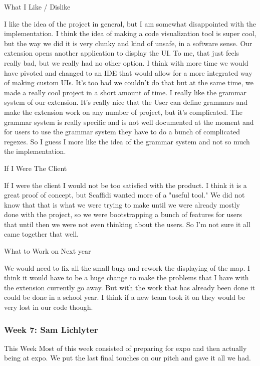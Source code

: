 What I Like / Dislike

I like the idea of the project in general, but I am somewhat disappointed with the implementation. I think the idea of making a code visualization tool is super cool, but the way we did it is very clunky and kind of unsafe, in a software sense. Our extension opens another application to display the UI. To me, that just feels really bad, but we really had no other option. I think with more time we would have pivoted and changed to an IDE that would allow for a more integrated way of making custom UIs. It's too bad we couldn't do that but at the same time, we made a really cool project in a short amount of time. I really like the grammar system of our extension. It's really nice that the User can define grammars and make the extension work on any number of project, but it's complicated. The grammar system is really specific and is not well documented at the moment and for users to use the grammar system they have to do a bunch of complicated regexes. So I guess I more like the idea of the grammar system and not so much the implementation. 

If I Were The Client

If I were the client I would not be too satisfied with the product. I think it is a great proof of concept, but Scaffidi wanted more of a "useful tool." We did not know that that is what we were trying to make until we were already mostly done with the project, so we were bootstrapping a bunch of features for users that until then we were not even thinking about the users. So I'm not sure it all came together that well.

What to Work on Next year

We would need to fix all the small bugs and rework the displaying of the map. I think it would have to be a huge change to make the problems that I have with the extension currently go away. But with the work that has already been done it could be done in a school year. I think if a new team took it on they would be very lost in our code though.




\subsubsection{Week 7: Sam Lichlyter}

This Week
Most of this week consisted of preparing for expo and then actually being at expo. We put the last final touches on our pitch and gave it all we had.

